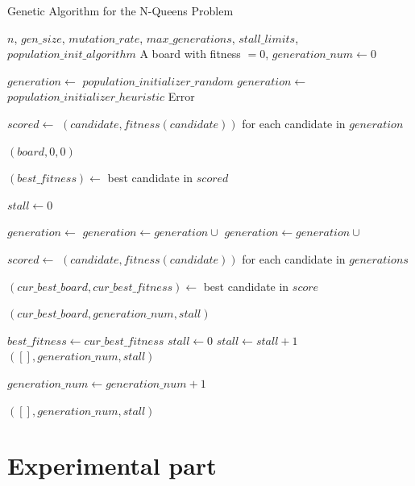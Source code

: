 \documentclass{scrartcl}
\begin{document}
\begin{algorithm}[H]
\caption{Genetic Algorithm for the N-Queens Problem}\label{alg:nqueens}
\begin{algorithmic}
\Require $n$, $gen\_size$, $mutation\_rate$, $max\_generations$, $stall\_limits$, $population\_init\_algorithm$
\Ensure A board with fitness $=0$,
\State $generation\_num \gets 0$

    \State $generation \gets$ $population\_initializer\_random$
    \State $generation \gets$ $population\_initializer\_heuristic$
\Else
    \State \Return Error
\EndIf

\State $scored \gets$ $(candidate, fitness(candidate))$ for each candidate in $generation$

        \State \Return$(board, 0, 0)$ 
    \EndIf
\EndFor

\State $(best\_fitness) \gets$ best candidate in $scored$

\State $stall \gets 0$

    \State $generation \gets$ 
    \State $generation \gets generation \cup$ 
    \State $generation \gets generation \cup$ 

    \State $scored \gets$ $(candidate, fitness(candidate))$ for each candidate in $generations$

    \State $(cur\_best\_board, cur\_best\_fitness) \gets$ best candidate in $score$

        \State \Return $(cur\_best\_board, generation\_num, stall)$
    \EndIf

        \State $best\_fitness \gets cur\_best\_fitness$
        \State $stall \gets 0$
    \Else
        \State $stall \gets stall + 1$
            \State \Return $([], generation\_num, stall)$
        \EndIf
    \EndIf

    \State $generation\_num \gets generation\_num + 1$
\EndWhile

\State \Return $([], generation\_num, stall)$    
\end{algorithmic}
\end{algorithm}

\section{Experimental part}
\label{sec:experimentation}
\end{document}
